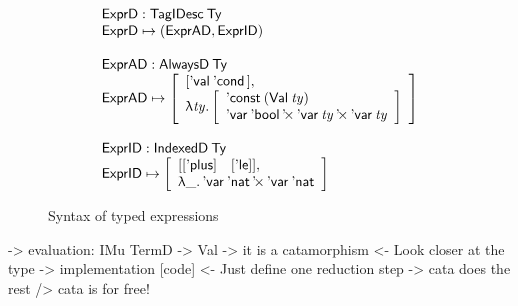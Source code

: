\begin{figure}

\[\stk{
\stk{
\HExprD : \TagIDesc{\Ty} \\
\HExprD \mapsto ( \HExprAD , \HExprID ) \\
} \\
\\
\stk{
\HExprAD : \ATagIDesc{\Ty} \\
\HExprAD \mapsto \bigRedBracket{
                 \begin{array}{l}
                   {\sqr{\SYMBEval\: \SYMBEcond \,}} \red{,} \\
                   \LAM{\V{ty}}
                   \bigRedBracket{
                   \begin{array}{l}
                   \DConst{(\Val{\V{ty}})} \\
                   \DProd{\DVar{\Ebool}}{\DProd{\DVar{\V{ty}}}{\DVar{\V{ty}}}}
                   \end{array}
                   }
                 \end{array}
                 }
\\
\\
} 
\\
\stk{
\HExprID : \ITagIDesc{\Ty} \\
\HExprID \mapsto \bigRedBracket{
                 \begin{array}{l}
                   \sqr{\sqr{\SYMBEplus} \quad \sqr{\SYMBEle}} \red{,} \\
                   \LAM{\_} \DProd{\DVar{\Enat}}{\DVar{\Enat}} 
                   \end{array}
                   }
}
}\]

\caption{Syntax of typed expressions}
\label{fig:hexpr-full}

\end{figure}

\begin{wstructure}
    -> evaluation: IMu TermD -> Val
        -> it is a catamorphism
            <- Look closer at the type
        -> implementation [code]
            <- Just define one reduction step
            -> cata does the rest
                /> cata is for free!
\end{wstructure}

\newcommand{\evalH}{\F{eval}_{\green{\Downarrow}}}
\newcommand{\evalOne}{\F{eval}_{\green{\downarrow}}}

